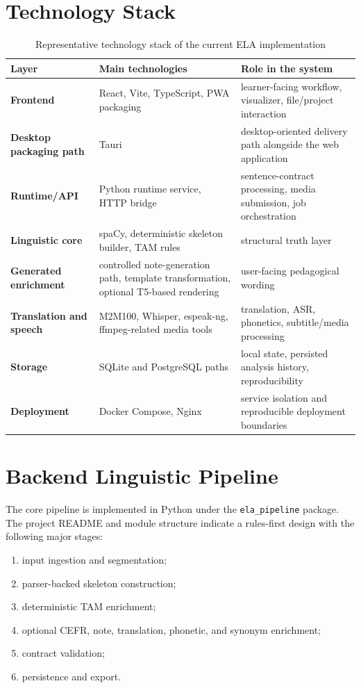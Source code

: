 \documentclass[12pt,a4paper,oneside]{report}
\begin{document}
\section{Technology Stack}
\begin{table}[H]
  \centering
  \caption{Representative technology stack of the current ELA implementation}
  \begin{tabularx}{\textwidth}{>{\bfseries}p{3.6cm}X X}
    \toprule
    Layer & Main technologies & Role in the system \\
    \midrule
    Frontend & React, Vite, TypeScript, PWA packaging & learner-facing workflow, visualizer, file/project interaction \\
    Desktop packaging path & Tauri & desktop-oriented delivery path alongside the web application \\
    Runtime/API & Python runtime service, HTTP bridge & sentence-contract processing, media submission, job orchestration \\
    Linguistic core & spaCy, deterministic skeleton builder, TAM rules & structural truth layer \\
    Generated enrichment & controlled note-generation path, template transformation, optional T5-based rendering & user-facing pedagogical wording \\
    Translation and speech & M2M100, Whisper, espeak-ng, ffmpeg-related media tools & translation, ASR, phonetics, subtitle/media processing \\
    Storage & SQLite and PostgreSQL paths & local state, persisted analysis history, reproducibility \\
    Deployment & Docker Compose, Nginx & service isolation and reproducible deployment boundaries \\
    \bottomrule
  \end{tabularx}
\end{table}

\section{Backend Linguistic Pipeline}
The core pipeline is implemented in Python under the \texttt{ela\_pipeline} package. The project README and module structure indicate a rules-first design with the following major stages:
\begin{enumerate}
  \item input ingestion and segmentation;
  \item parser-backed skeleton construction;
  \item deterministic TAM enrichment;
  \item optional CEFR, note, translation, phonetic, and synonym enrichment;
  \item contract validation;
  \item persistence and export.
\end{enumerate}
\end{document}
